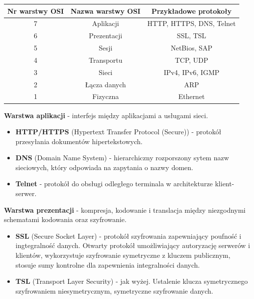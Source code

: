 \documentclass[12pt]{article}
\begin{document}
    \begin{table}[H]
        \begin{center}
            \begin{tabular}{|c|c|c| }
                \hline
                \textbf{Nr warstwy OSI} & \textbf{Nazwa warstwy OSI} & \textbf{Przykładowe protokoły}\\
                \hline
                \hline
                7 & Aplikacji & HTTP, HTTPS, DNS, Telnet\\
                \hline
                6 & Prezentacji & SSL, TSL\\
                \hline
                5 & Sesji & NetBios, SAP\\
                \hline
                4 & Transportu & TCP, UDP\\
                \hline
                3 & Sieci & IPv4, IPv6, IGMP\\
                \hline
                2 & Łącza danych & ARP\\
                \hline
                1 & Fizyczna & Ethernet\\
                \hline
            \end{tabular}
        \end{center}
    \end{table}

    \noindent \textbf{Warstwa aplikacji} - interfejs między aplikacjami a
    usługami sieci.
    \begin{itemize}
        \item \textbf{HTTP/HTTPS} (Hypertext Transfer Protocol (Secure)) - protokół przesyłania dokumentów hipertekstowych.
        \item \textbf{DNS} (Domain Name System) - hierarchiczny rozporszony sytem nazw sieciowych, który odpowiada na zapytania
        o nazwy domen.
        \item \textbf{Telnet} - protokół do obsługi odległego terminala w architekturze klient-serwer.
    \end{itemize}

    \noindent \textbf{Warstwa prezentacji} - kompresja, kodowanie i
    translacja między niezgodnymi schematami kodowania oraz szyfrowanie.
    \begin{itemize}
        \item \textbf{SSL} (Secure Socket Layer) - protokół szyfrowania zapewniający poufność i ingtegralność danych.
        Otwarty protokół umożliwiający autoryzację serwerów i klientów, wykorzystuje szyfrowanie symetryczne
        z kluczem publicznym, stosuje sumy kontrolne dla zapewnienia integralności danych.
        \item \textbf{TSL} (Transport Layer Security) - jak wyżej. Ustalenie klucza symetrycznego szyfrowaniem niesymetrycznym,
        symetryczne szyfrowanie danych.
    \end{itemize}
\end{document}

